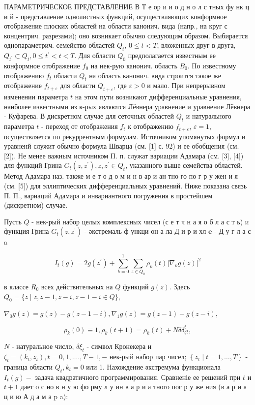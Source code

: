 \documentclass[10pt]{article}
\begin{document}
ПАРАМЕТРИЧЕСКОЕ ПРЕДСТАВЛЕНИЕ В Т е ор и и о д н о л с тных фу нк ц и й - представление однолистных функций, осуществляющих конформное отображение плоских областей на области канонич. вида (напр., на круг с концентрич. разрезами); оно возникает обычно следующим образом. Выбирается однопараметрич. семейство областей $Q_{t}$, $0 \leqslant t<T$, вложенных друг в друга, $Q_{t^{\prime}} \subset Q_{t}, 0 \leqslant t^{\prime}<t<T$. Для области $Q_{0}$ предполагается известным ее конформное отображение $f_{0}$ на нек-рую канонич. область $B_{0}$. По известному отображению $f_{t}$ области $Q_{t}$ на область канонич. вида строится такое же отображение $f_{t+\varepsilon}$ для области $Q_{t+\varepsilon}$, где $\varepsilon>0$ и мало. При непрерывном изменении параметра $t$ на этом пути возникают дифференциальные уравнения, наиболее известными из к-рых являются Лёвнера уравнение и уравнение Лёвнера - Куфарева. В дискретном случае для сеточных областей $Q_{t}$ и натурального параметра $t$ - переход от отображения $f_{t}$ к отображению $f_{t+\varepsilon}$, $\varepsilon=1$, осуществляется по рекуррентным формулам. Источником упомянутых формул и уравненй служит обычно формула Шварца (см. [1] с. 92) и ее обобщения (см. [2]). Не менее важным источником П. п. служат вариации Адамара (см. [3], [4]) для функций Грина $G_{t}\left(z, z^{\prime}\right), z, z^{\prime} \in Q_{t}$, указанного выше семейства областей. Метод Адамара наз. также м е т о д о м и н в ар и ан тно го по г р у жен и я (см. [5]) для эллиптических дифференциальных уравнений. Ниже показана связь П. П., вариаций Адамара и инвариантного погружения в простейшем (дискретном) случае.

Пусть $Q$ - нек-рый набор целых комплексных чисел (с е т ч н а я о б л а с т ь) и функция Грина $G_{t}\left(z, z^{\prime}\right)$ - әкстремаль ф ункци он а ла Д и р и хл $\mathbf{e}$ - Д у г л а с a

\[
I_{t}(g)=2 g\left(z^{\prime}\right)+\sum_{k=0}^{1} \sum_{z \in Q_{0}} \rho_{k}(t)\left|\nabla_{k} g(z)\right|^{2}
\]

в классе $R_{0}$ всех действительных на $Q$ функций $g(z)$. Здесь $Q_{0}=\{z \mid z, z-1, z-i, z-1-i \in Q\}$,

$\nabla_{0} g(z)=g(z)-g(z-1-i), \nabla_{1} g(z)=g(z-1)-g(z-i)$,

\[
\rho_{k}(0) \equiv 1, \rho_{k}(t+1)=\rho_{k}(t)+N \delta \delta_{\zeta t}^{t},
\]

$N$ - натуральное число, $\delta \xi_{t}$ - символ Кронекера и $\zeta_{t}=\left(k_{t}, z_{t}\right), t=0,1, \ldots ., T-1,-$ нек-рый набор пар чисел; $\left\{z_{t} \mid t=1, \ldots, T\right\}$ - граница области $Q_{t}, k_{t}=0$ или 1. Нахождение әкстремума функционала $I_{t}(g)-$ задача квадратичного программирования. Сравненіе ее решений при $t$ и $t+1$ дает о с но в н у ю фо рму л у ин в а р и а тного пог р у же ния (в а р и а ц и ю А д а м а p a):
\end{document}

